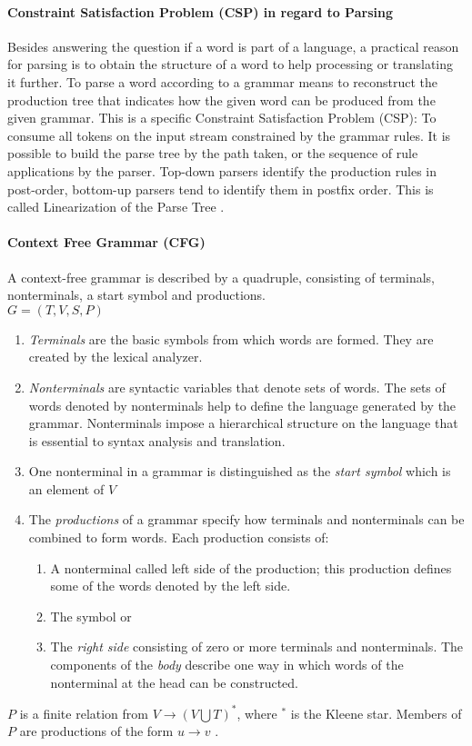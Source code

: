 \paragraph{Constraint Satisfaction Problem (CSP) in regard to Parsing} 
Besides answering the question if a word is part of a language, a practical reason for parsing is to obtain the structure of a word to help processing or translating it further. To parse a word according to a grammar means to reconstruct the production tree that indicates how the given word can be produced from the given grammar. This is a specific Constraint Satisfaction Problem (CSP): To consume all tokens on the input stream constrained by the grammar rules. It is possible to build the parse tree by the path taken, or the sequence of rule applications by the parser.  Top-down parsers identify the production rules in post-order, bottom-up parsers tend to identify them in postfix order. This is called Linearization of the Parse Tree \cite{ParserBook}.

\paragraph{Context Free Grammar (CFG)}
A context-free grammar is described by a quadruple, consisting of terminals, nonterminals, a start symbol and productions.\\
$G = (T, V, S, P)$
\begin{enumerate}
	\item \emph{Terminals} are the basic symbols from which words are formed.  They are created by the lexical analyzer.
	\item \emph{Nonterminals} are syntactic variables that denote sets of words. The sets of words denoted by nonterminals help to define the language generated by the grammar. Nonterminals impose a hierarchical structure on the language that is essential to syntax analysis and translation.
	\item One nonterminal in a grammar is distinguished as the \emph{start symbol} which is an element of $V$
	\item The \emph{productions} of a grammar specify how terminals and nonterminals can be combined to form words. Each production consists of:
	\begin{enumerate}
		\item A nonterminal called left side of the production; this production defines some of the words denoted by the left side.
		\item The symbol \code{$\rightarrow$}  or  \code{::=} 
		\item The \emph{right side} consisting of zero or more terminals and nonterminals. The components of the \emph{body} describe one way in which words of the nonterminal at the head can be constructed.
	\end{enumerate}
\end{enumerate}
 $P$ is a finite relation from $V \rightarrow (V  \bigcup  T)^*$, where $^*$ is the Kleene star. Members of $P$ are productions of the form $u \rightarrow v$ \cite{DragonBook}.

